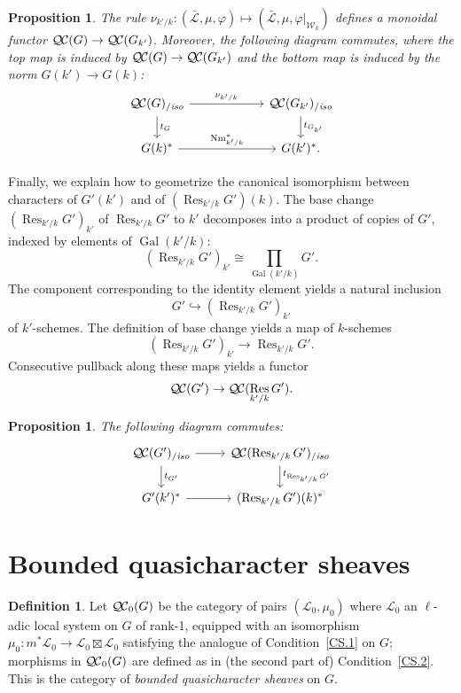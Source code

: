 \documentclass[11pt]{amsart}
\theoremstyle{plain}
\newtheorem{proposition}[theorem]{Proposition}
\theoremstyle{definition}
\newtheorem{definition}[theorem]{Definition}
\theoremstyle{remark}
\newcommand{\Fq}{k}
\DeclareMathOperator{\Gal}{Gal}
\DeclareMathOperator{\Res}{Res}
\DeclareMathOperator{\Nm}{Nm}
\newcommand{\cs}[1]{{\mathcal{#1}}}
\newcommand{\gcs}[1]{{\mathcal{\bar #1}}}
\newcommand{\QC}{{\mathcal{Q\hskip-0.8pt C}}}
\newcommand{\QCb}{{\QC_0}}
\newcommand{\QCiso}[1]{\QC(#1)_{/\textit{iso}}}
\newcommand{\Weil}[1]{\mathcal{W}_{#1}}
\newcommand{\trFrob}[1]{t_{#1}}
\begin{document}
\begin{proposition}\label{prop:basechange}
 The rule $\nu_{k'/k}: (\gcs{L}, \mu, \varphi) \mapsto (\gcs{L}, \mu, \varphi\vert_{\Weil{\Fq}})$ 
 defines a monoidal functor $\QC(G) \to \QC(G_{k'})$. 
 Moreover, the following diagram commutes, 
 where the top map is induced by $\QC(G) \to \QC(G_{k'})$ 
 and the bottom map is induced by the norm $G(k') \rightarrow G(k)$:
\[
\begin{tikzcd}[column sep=60]
\QCiso{G} \rar{\nu_{k'/k}} \dar{\trFrob{G}} & \QCiso{G_{k'}} \dar{\trFrob{G_{k'}}} \\
G(k)^*  \rar{\Nm_{k'/k}^*} & G(k')^*.
\end{tikzcd}
\]
\end{proposition}


Finally, we explain how to geometrize the canonical isomorphism between characters of $G'(k')$ and of $(\Res_{k'/k}G')(k)$.
The base change $(\Res_{k'/k}G')_{k'}$ of $\Res_{k'/k}G'$ to $k'$
decomposes into a product of copies of $G'$, indexed by elements of $\Gal(k'/k)$:
\[
(\Res_{k'/k}G')_{k'} \cong \prod_{\Gal(k'/k)} G'.
\]
The component corresponding to the identity element yields a natural inclusion 
\[
G' \hookrightarrow (\Res_{k'/k}G')_{k'}
\]
of $k'$-schemes.  The definition of base change yields a map of $k$-schemes
\[
(\Res_{k'/k}G')_{k'} \to \Res_{k'/k}G'.
\]
Consecutive pullback along these maps yields a functor
\[
\QC(G') \to \QC(\Res_{k'/k}G').
\]

\begin{proposition}
The following diagram commutes:
\[
\begin{tikzcd}
\QCiso{G'} \dar{\trFrob{G'}} \rar & \QCiso{\Res_{k'/k} G'} \dar{\trFrob{\Res_{k'/k} G'}} \\
 G'(k')^* \rar & (\Res_{k'/k}G')(k)^*
\end{tikzcd}
\]
\end{proposition}

\section{Bounded quasicharacter sheaves}\label{sec:bounded}

\begin{definition}
Let $\QCb(G)$ be the category of pairs $(\cs{L}_0,\mu_0)$ 
where $\cs{L}_0$ an $\ell$-adic local system on $G$ of rank-1, 
equipped with an isomorphism $\mu_0 : m^* \cs{L}_0 \to \cs{L}_0 \boxtimes \cs{L}_0$ 
satisfying the analogue of Condition~\ref{CS.1} on $G$; 
morphisms in $\QCb(G)$ are defined as in (the second part of) Condition~\ref{CS.2}. 
This is the category of \emph{bounded quasicharacter sheaves} on $G$. 
\end{definition}
\end{document}
